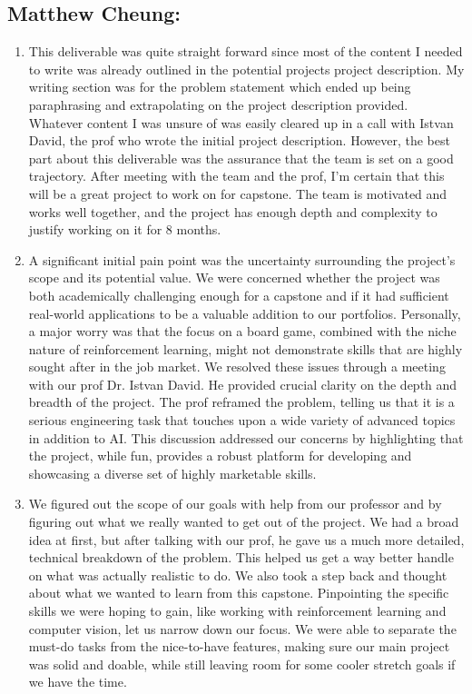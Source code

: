 \documentclass{article}
\begin{document}
\subsection*{Matthew Cheung:}\label{subsec:matthew-cheung-reflection}
\begin{enumerate}
    \item
        This deliverable was quite straight forward since most of the content I needed to write was already outlined in the potential projects project description.
        My writing section was for the problem statement which ended up being paraphrasing and extrapolating on the project description provided.
        Whatever content I was unsure of was easily cleared up in a call with Istvan David, the prof who wrote the initial project description.
        However, the best part about this deliverable was the assurance that the team is set on a good trajectory.
        After meeting with the team and the prof, I'm certain that this will be a great project to work on for capstone.
        The team is motivated and works well together, and the project has enough depth and complexity to justify working on it for 8 months.
    \item
        A significant initial pain point was the uncertainty surrounding the project's scope and its potential value.
        We were concerned whether the project was both academically challenging enough for a capstone and if it had sufficient real-world applications to be a valuable addition to our portfolios.
        Personally, a major worry was that the focus on a board game, combined with the niche nature of reinforcement learning, might not demonstrate skills that are highly sought after in the job market.
        We resolved these issues through a meeting with our prof Dr. Istvan David.
        He provided crucial clarity on the depth and breadth of the project.
        The prof reframed the problem, telling us that it is a serious engineering task that touches upon a wide variety of advanced topics in addition to AI.
        This discussion addressed our concerns by highlighting that the project, while fun, provides a robust platform for developing and showcasing a diverse set of highly marketable skills.
    \item
        We figured out the scope of our goals with help from our professor and by figuring out what we really wanted to get out of the project.
        We had a broad idea at first, but after talking with our prof, he gave us a much more detailed, technical breakdown of the problem.
        This helped us get a way better handle on what was actually realistic to do.
        We also took a step back and thought about what we wanted to learn from this capstone.
        Pinpointing the specific skills we were hoping to gain, like working with reinforcement learning and computer vision, let us narrow down our focus.
        We were able to separate the must-do tasks from the nice-to-have features, making sure our main project was solid and doable, while still leaving room for some cooler stretch goals if we have the time.

\end{enumerate}
\end{document}
